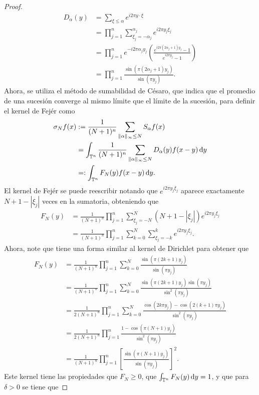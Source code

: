 \begin{proof}
	\begin{align*}
		D_\alpha(y) & =  \sum_{\xi\leq\alpha} e^{i2\pi y\cdot\xi}  \\
		& = \prod_{j=1}^n \sum_{\xi_j=- \alpha_j}^{\alpha_j} e^{i2\pi y_j\xi_j} \\
		& = \prod_{j=1}^n e^{-i2\pi \alpha_jy_j}\left(\frac{e^{i2\pi(2\alpha_j+1)y_j} - 1}{e^{i2\pi y_j}-1}
		\right) \\
		& = \prod_{j=1}^n \frac{\sin(\pi(2\alpha_j+1)y_j)}{\sin(\pi y_j)}.
	\end{align*}
	Ahora, se utiliza el método de sumabilidad de Césaro, que indica que el promedio de una sucesión converge al mismo límite que el límite de la sucesión, para definir el kernel de Fejér como
	 \begin{align*}
	 	\sigma_Nf(x) & := \frac{1}{(N+1)^n}\sum_{\|\alpha\|_\infty\leq N} S_\alpha f(x)\\
	 	& = \int_{\mathbb{T}^n} \frac{1}{(N+1)^n}\sum_{\|\alpha\|_\infty\leq N}D_\alpha(y) f(x-y)\mathop{}\!\mathrm{d} y \\
	 	& =: \int_{\mathbb{T}^n} F_N(y) f(x-y)\mathop{}\!\mathrm{d} y.
	 \end{align*}
	 El kernel de Fejér se puede reescribir notando que $e^{i2\pi y_j\xi_j}$ aparece exactamente $N+1-|\xi_j|$ veces en la sumatoria, obteniendo que
	 \begin{align*}
	 	F_N(y) &= \frac{1}{(N+1)^n} \prod_{j=1}^n \sum_{\xi_j=-N}^N (N+1-|\xi_j|)e^{i2\pi y_j\xi_j}\\
	 	& =  \frac{1}{(N+1)^n} \prod_{j=1}^n \sum_{k=0}^N \sum_{\xi_j=-k}^k e^{i2\pi y_j\xi_j}.
	 \end{align*}
	 Ahora, note que tiene una forma similar al kernel de Dirichlet para obtener que
	 \begin{align*}
	 	F_N(y) 
	 	& =\frac{1}{(N+1)^n}  \prod_{j=1}^n \sum_{k=0}^N \frac{\sin(\pi(2k+1)y_j)}{\sin(\pi y_j)} \\
	 	& = \frac{1}{(N+1)^n}  \prod_{j=1}^n \sum_{k=0}^N \frac{\sin(\pi(2k+1)y_j)\sin(\pi y_j)}{\sin^2(\pi y_j)} \\ 
	 	& = \frac{1}{2(N+1)^n}  \prod_{j=1}^n\sum_{k=0}^N \frac{\cos(2k\pi y_j) - \cos(2(k+1)\pi y_j)}{\sin^2(\pi y_j)} \\
	 	& = \frac{1}{2(N+1)^n}  \prod_{j=1}^n \frac{1-\cos(\pi(N+1)y_j)}{\sin^2(\pi y_j)} \\
	 	& = \frac{1}{(N+1)^n}  \prod_{j=1}^n \left[ \frac{\sin(\pi(N+1)y_j)}{\sin(\pi y_j)}
	 	\right]^2.
	 \end{align*}
	 Este kernel tiene las propiedades que $F_N \geq 0$, que $\int_{\mathbb{T}^n}F_N(y)\mathop{}\!\mathrm{d} y=1$, y que para $\delta>0$ se tiene que

\end{proof}

